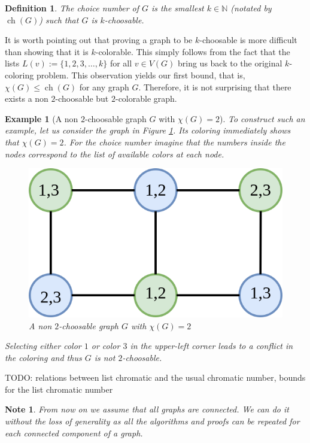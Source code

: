 \documentclass[a4paper, 12pt]{article}
\newtheorem{defin}[lem]{Definition}
\newtheorem{note}[lem]{Note}
\newtheorem{example}[lem]{Example}
\DeclareMathOperator*{\ch}{ch}
\begin{document}
\begin{defin} The \textit{choice number} of $G$ is the smallest $k \in \mathbb{N}$ (notated by $\ch(G)$) such that $G$ is $k$-choosable.
\end{defin}
It is worth pointing out that proving a graph to be $k$-choosable is more difficult than showing that it is $k$-colorable. This simply follows from the fact that the lists $L(v):=\lbrace 1,2,3,\ldots,k\rbrace$ for all $v \in V(G)$ bring us back to the original $k$-coloring problem. This observation yields our first bound, that is, $\chi(G) \leqslant \ch(G)$ for any graph $G$. Therefore, it is not surprising that there exists a non $2$-choosable but $2$-colorable graph.
\begin{example}[A non $2$-choosable graph $G$ with $\chi(G)=2$]\label{ex:2-colorable-ch3}
To construct such an example, let us consider the graph in Figure \ref{fig:2-colorable-ch3}. Its coloring immediately shows that $\chi(G)=2$. For the choice number imagine that the numbers inside the nodes correspond to the list of available colors at each node.
\begin{figure}[!h]
\centering
\includegraphics[scale=0.3]{figures/2-colorable-3ch.png}
\caption{A non $2$-choosable graph $G$ with $\chi(G)=2$}\label{fig:2-colorable-ch3}
\end{figure}
Selecting either color $1$ or color $3$ in the upper-left corner leads to a conflict in the coloring and thus $G$ is not $2$-choosable.
\end{example}

TODO: relations between list chromatic and the usual chromatic number, bounds for the list chromatic number

\begin{note}From now on we assume that all graphs are connected. We can do it without the loss of generality as all the algorithms and proofs can be repeated for each connected component of a graph.\end{note}
\end{document}
